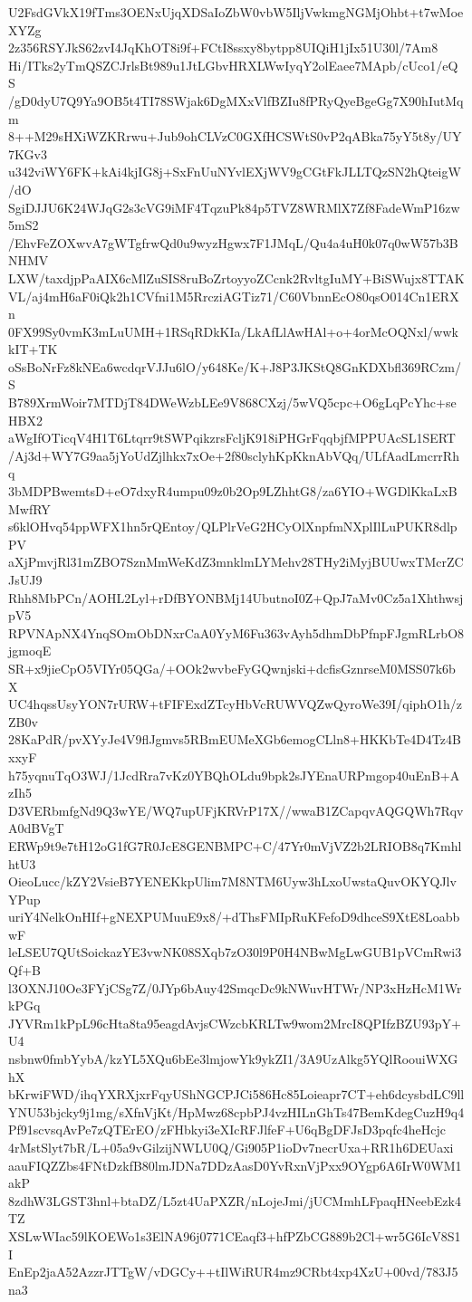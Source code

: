 U2FsdGVkX19fTms3OENxUjqXDSaIoZbW0vbW5IljVwkmgNGMjOhbt+t7wMoeXYZg
2z356RSYJkS62zvI4JqKhOT8i9f+FCtI8ssxy8bytpp8UIQiH1jIx51U30l/7Am8
Hi/ITks2yTmQSZCJrlsBt989u1JtLGbvHRXLWwIyqY2olEaee7MApb/cUco1/eQS
/gD0dyU7Q9Ya9OB5t4TI78SWjak6DgMXxVlfBZIu8fPRyQyeBgeGg7X90hIutMqm
8++M29sHXiWZKRrwu+Jub9ohCLVzC0GXfHCSWtS0vP2qABka75yY5t8y/UY7KGv3
u342viWY6FK+kAi4kjIG8j+SxFnUuNYvlEXjWV9gCGtFkJLLTQzSN2hQteigW/dO
SgiDJJU6K24WJqG2s3cVG9iMF4TqzuPk84p5TVZ8WRMlX7Zf8FadeWmP16zw5mS2
/EhvFeZOXwvA7gWTgfrwQd0u9wyzHgwx7F1JMqL/Qu4a4uH0k07q0wW57b3BNHMV
LXW/taxdjpPaAIX6cMlZuSIS8ruBoZrtoyyoZCcnk2RvltgIuMY+BiSWujx8TTAK
VL/aj4mH6aF0iQk2h1CVfni1M5RrcziAGTiz71/C60VbnnEcO80qsO014Cn1ERXn
0FX99Sy0vmK3mLuUMH+1RSqRDkKIa/LkAfLlAwHAl+o+4orMcOQNxl/wwkkIT+TK
oSsBoNrFz8kNEa6wcdqrVJJu6lO/y648Ke/K+J8P3JKStQ8GnKDXbfl369RCzm/S
B789XrmWoir7MTDjT84DWeWzbLEe9V868CXzj/5wVQ5cpc+O6gLqPcYhc+seHBX2
aWgIfOTicqV4H1T6Ltqrr9tSWPqikzrsFcljK918iPHGrFqqbjfMPPUAcSL1SERT
/Aj3d+WY7G9aa5jYoUdZjlhkx7xOe+2f80sclyhKpKknAbVQq/ULfAadLmcrrRhq
3bMDPBwemtsD+eO7dxyR4umpu09z0b2Op9LZhhtG8/za6YIO+WGDlKkaLxBMwfRY
s6klOHvq54ppWFX1hn5rQEntoy/QLPlrVeG2HCyOlXnpfmNXplIlLuPUKR8dlpPV
aXjPmvjRl31mZBO7SznMmWeKdZ3mnklmLYMehv28THy2iMyjBUUwxTMcrZCJsUJ9
Rhh8MbPCn/AOHL2Lyl+rDfBYONBMj14UbutnoI0Z+QpJ7aMv0Cz5a1XhthwsjpV5
RPVNApNX4YnqSOmObDNxrCaA0YyM6Fu363vAyh5dhmDbPfnpFJgmRLrbO8jgmoqE
SR+x9jieCpO5VIYr05QGa/+OOk2wvbeFyGQwnjski+dcfisGznrseM0MSS07k6bX
UC4hqssUsyYON7rURW+tFIFExdZTcyHbVcRUWVQZwQyroWe39I/qiphO1h/zZB0v
28KaPdR/pvXYyJe4V9flJgmvs5RBmEUMeXGb6emogCLln8+HKKbTe4D4Tz4BxxyF
h75yqnuTqO3WJ/1JcdRra7vKz0YBQhOLdu9bpk2sJYEnaURPmgop40uEnB+AzIh5
D3VERbmfgNd9Q3wYE/WQ7upUFjKRVrP17X//wwaB1ZCapqvAQGQWh7RqvA0dBVgT
ERWp9t9e7tH12oG1fG7R0JcE8GENBMPC+C/47Yr0mVjVZ2b2LRIOB8q7KmhlhtU3
OieoLucc/kZY2VsieB7YENEKkpUlim7M8NTM6Uyw3hLxoUwstaQuvOKYQJlvYPup
uriY4NelkOnHIf+gNEXPUMuuE9x8/+dThsFMIpRuKFefoD9dhceS9XtE8LoabbwF
leLSEU7QUtSoickazYE3vwNK08SXqb7zO30l9P0H4NBwMgLwGUB1pVCmRwi3Qf+B
l3OXNJ10Oe3FYjCSg7Z/0JYp6bAuy42SmqcDc9kNWuvHTWr/NP3xHzHcM1WrkPGq
JYVRm1kPpL96cHta8ta95eagdAvjsCWzcbKRLTw9wom2MrcI8QPIfzBZU93pY+U4
nsbnw0fmbYybA/kzYL5XQu6bEe3lmjowYk9ykZI1/3A9UzAlkg5YQlRoouiWXGhX
bKrwiFWD/ihqYXRXjxrFqyUShNGCPJCi586Hc85Loieapr7CT+eh6dcysbdLC9ll
YNU53bjcky9j1mg/sXfnVjKt/HpMwz68cpbPJ4vzHILnGhTs47BemKdegCuzH9q4
Pf91scvsqAvPe7zQTErEO/zFHbkyi3eXIcRFJlfeF+U6qBgDFJsD3pqfc4heHcjc
4rMstSlyt7bR/L+05a9vGilzijNWLU0Q/Gi905P1ioDv7necrUxa+RR1h6DEUaxi
aauFIQZZbs4FNtDzkfB80lmJDNa7DDzAasD0YvRxnVjPxx9OYgp6A6IrW0WM1akP
8zdhW3LGST3hnl+btaDZ/L5zt4UaPXZR/nLojeJmi/jUCMmhLFpaqHNeebEzk4TZ
XSLwWIac59lKOEWo1s3ElNA96j0771CEaqf3+hfPZbCG889b2Cl+wr5G6IcV8S1I
EnEp2jaA52AzzrJTTgW/vDGCy++tIlWiRUR4mz9CRbt4xp4XzU+00vd/783J5na3
